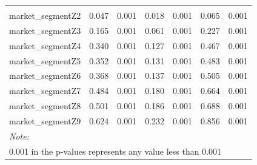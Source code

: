 \documentclass[Royal,times,sageh]{sagej}
\begin{document}
\begin{table}
{\begin{tabular}[t]{lcccccc}
\addlinespace[0.3em]
\multicolumn{7}{l}{\textbf{Market segments}}\\
\hspace{1em}market\_segmentZ2 & 0.047 & 0.001 & 0.018 & 0.001 & 0.065 & 0.001\\
\hspace{1em}market\_segmentZ3 & 0.165 & 0.001 & 0.061 & 0.001 & 0.227 & 0.001\\
\hspace{1em}market\_segmentZ4 & 0.340 & 0.001 & 0.127 & 0.001 & 0.467 & 0.001\\
\hspace{1em}market\_segmentZ5 & 0.352 & 0.001 & 0.131 & 0.001 & 0.483 & 0.001\\
\hspace{1em}market\_segmentZ6 & 0.368 & 0.001 & 0.137 & 0.001 & 0.505 & 0.001\\
\hspace{1em}market\_segmentZ7 & 0.484 & 0.001 & 0.180 & 0.001 & 0.664 & 0.001\\
\hspace{1em}market\_segmentZ8 & 0.501 & 0.001 & 0.186 & 0.001 & 0.688 & 0.001\\
\hspace{1em}market\_segmentZ9 & 0.624 & 0.001 & 0.232 & 0.001 & 0.856 & 0.001\\
\bottomrule
\multicolumn{7}{l}{\rule{0pt}{1em}\textit{Note: }}\\
\multicolumn{7}{l}{\rule{0pt}{1em}0.001 in the p-values represents any value less than 0.001}\\
\end{tabular}}
\end{table}
\end{document}
